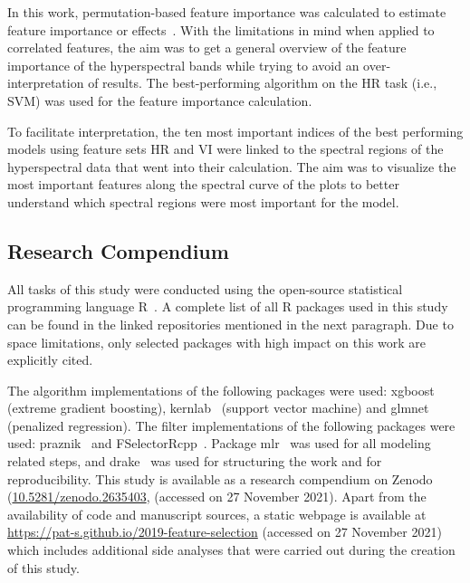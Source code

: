 \documentclass[remotesensing,article,accept,moreauthors,pdftex]{Definitions/mdpi}
\begin{document}
\begin{paracol}{2}
In this work, permutation-based feature importance was calculated to estimate feature importance or effects~\cite{apley2019}.
With the limitations in mind when applied to correlated features, the aim was to get a general overview of the feature importance of the hyperspectral bands while trying to avoid an over-interpretation of results.
The best-performing algorithm on the HR task (i.e., SVM) was used for the feature importance calculation.


To facilitate interpretation, the ten most important indices of the best performing models using feature sets HR and VI were linked to the spectral regions of the hyperspectral data that went into their calculation.
The aim was to visualize the most important features along the spectral curve of the plots to better understand which spectral regions were most important for the model.

\subsection{Research Compendium}

All tasks of this study were conducted using the open-source statistical programming language R~\cite{rcoreteam2019}.
A complete list of all R packages used in this study can be found in the linked repositories mentioned in the next paragraph.
Due to space limitations, only selected packages with high impact on this work are explicitly cited.

The algorithm implementations of the following packages were used: xgboost~\cite{chen2016} (extreme gradient boosting), kernlab~\cite{kernlab} (support vector machine) and glmnet~\cite{glmnet} (penalized regression).
The filter implementations of the following packages were used: praznik~\cite{praznik} and FSelectorRcpp~\cite{fselectorrcpp}.
Package mlr~\cite{mlr} was used for all modeling related steps, and drake~\cite{drake} was used for structuring the work and for reproducibility.
This study is available as a research compendium on Zenodo (\url{10.5281/zenodo.2635403}, (accessed on 27 November 2021).
Apart from the availability of code and manuscript sources, a static webpage is available at \url{https://pat-s.github.io/2019-feature-selection} (accessed on 27 November 2021) which includes additional side analyses that were carried out during the creation of this study.


\end{paracol}
\end{document}
